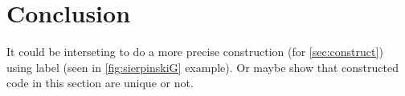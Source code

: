\documentclass[10pt,a4paper,notitlepage]{article}
\begin{document}
\section{Conclusion}
It could be interseting to do a more precise construction (for \ref{sec:construct}) using label (seen in \ref{fig:sierpinskiG} example).
Or maybe show that constructed code in this section are unique or not.

\hugejump



\end{document}
